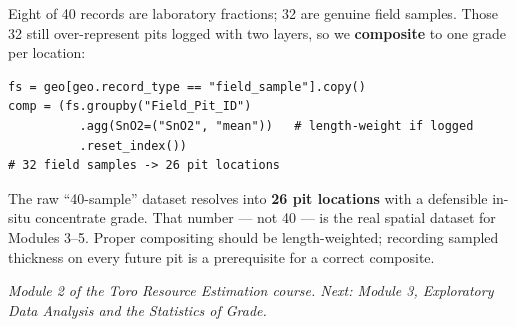 \documentclass[11pt]{article}
\begin{document}
Eight of 40 records are laboratory fractions; 32 are genuine field
samples. Those 32 still over-represent pits logged with two layers, so we
\textbf{composite} to one grade per location:

\begin{lstlisting}
fs = geo[geo.record_type == "field_sample"].copy()
comp = (fs.groupby("Field_Pit_ID")
          .agg(SnO2=("SnO2", "mean"))   # length-weight if logged
          .reset_index())
# 32 field samples -> 26 pit locations
\end{lstlisting}

\begin{keybox}
The raw ``40-sample'' dataset resolves into \textbf{26 pit locations}
with a defensible in-situ concentrate grade. That number --- not 40 ---
is the real spatial dataset for Modules 3--5. Proper compositing should
be length-weighted; recording sampled thickness on every future pit is a
prerequisite for a correct composite.
\end{keybox}

\vspace{4pt}{\color{line}\hrule}\vspace{4pt}
{\small\itshape Module 2 of the Toro Resource Estimation course. Next:
Module 3, Exploratory Data Analysis and the Statistics of Grade.}
\end{document}
